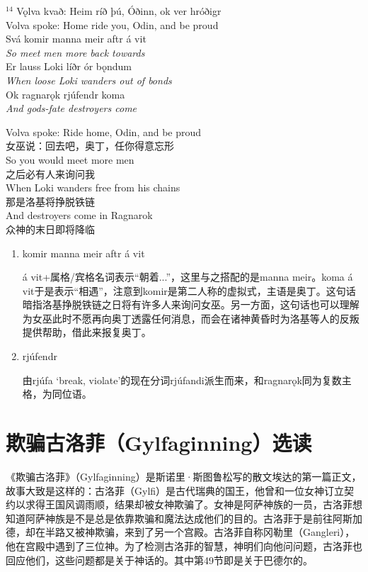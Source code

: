 \begin{paracol}{2}
  \noindent
  $^{14}$ Vǫlva kvað: Heim ríð þú, Óðinn, ok ver hróðigr\\
  Volva spoke: Home ride you, Odin, and be proud\\
  Svá komir manna meir aftr á vit\\
  \textit{So meet men more back towards}\\
  Er lauss Loki líðr ór bǫndum\\
  \textit{When loose Loki wanders out of bonds} \\
  Ok ragnarǫk rjúfendr koma\\
  \textit{And gods-fate destroyers come}

  \switchcolumn
  \noindent
  Volva spoke: Ride home, Odin, and be proud\\
  女巫说：回去吧，奥丁，任你得意忘形\\
  So you would meet more men\\
  之后必有人来询问我\\
  When Loki wanders free from his chains\\
  那是洛基将挣脱铁链\\
  And destroyers come in Ragnarok\\
  众神的末日即将降临
\end{paracol}
\begin{grammar*}{}
  \begin{enumerate}[leftmargin=*]
    \item komir manna meir aftr á vit

          á vit+属格/宾格名词表示“朝着...”，这里与之搭配的是manna meir。koma á vit于是表示“相遇”，注意到komir是第二人称的虚拟式，主语是奥丁。这句话暗指洛基挣脱铁链之日将有许多人来询问女巫。另一方面，这句话也可以理解为女巫此时不愿再向奥丁透露任何消息，而会在诸神黄昏时为洛基等人的反叛提供帮助，借此来报复奥丁。

    \item rjúfendr

          由rjúfa `break, violate'的现在分词rjúfandi派生而来，和ragnarǫk同为复数主格，为同位语。

  \end{enumerate}
\end{grammar*}
\section{欺骗古洛菲（Gylfaginning）选读}
《欺骗古洛菲》（Gylfaginning）是斯诺里·斯图鲁松写的散文埃达的第一篇正文，故事大致是这样的：古洛菲（Gylfi）是古代瑞典的国王，他曾和一位女神订立契约以求得王国风调雨顺，结果却被女神欺骗了。女神是阿萨神族的一员，古洛菲想知道阿萨神族是不是总是依靠欺骗和魔法达成他们的目的。古洛菲于是前往阿斯加德，却在半路又被神欺骗，来到了另一个宫殿。古洛菲自称冈勒里（Gangleri），他在宫殿中遇到了三位神。为了检测古洛菲的智慧，神明们向他问问题，古洛菲也回应他们，这些问题都是关于神话的。其中第49节即是关于巴德尔的。

